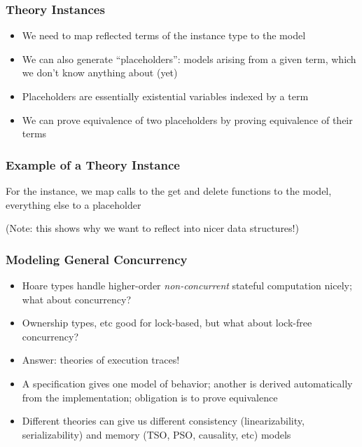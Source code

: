 \documentclass{beamer}
\begin{document}
\begin{frame}
  \frametitle{Theory Instances}
  \begin{itemize}
    \item We need to map reflected terms of the instance type to the model
    \item We can also generate ``placeholders'': models arising from a
      given term, which we don't know anything about (yet)
    \item Placeholders are essentially existential variables indexed
      by a term
    \item We can prove equivalence of two placeholders by proving
      equivalence of their terms
  \end{itemize}
\end{frame}

\begin{frame}
  \frametitle{Example of a Theory Instance}

  For the instance, we map calls to the get and delete functions to
  the model, everything else to a placeholder
  \lstset{language=haskell, basicstyle=\ttfamily\scriptsize}
  
  (Note: this shows why we want to reflect into nicer data structures!)
\end{frame}

\begin{frame}
  \frametitle{Modeling General Concurrency}
  \begin{itemize}
    \item Hoare types handle higher-order \emph{non-concurrent}
      stateful computation nicely; what about concurrency?
    \item Ownership types, etc good for lock-based, but what about
      lock-free concurrency?
    \item Answer: theories of execution traces!
    \item A specification gives one model of behavior; another is
      derived automatically from the implementation; obligation is to
      prove equivalence
    \item Different theories can give us different consistency
      (linearizability, serializability) and memory (TSO, PSO,
      causality, etc) models
  \end{itemize}
\end{frame}
\end{document}
